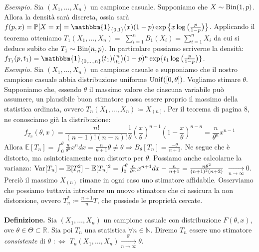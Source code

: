 \textit{Esempio.} Sia $(X_1,\ldots,X_n)$ un campione casuale. Supponiamo che $X\sim \operatorname{Bin}(1,p)$. Allora la densità sarà discreta, ossia sarà $f(p,x)=\mathbb{P}[X=x]=\mathbbm{1}_{\{0,1\}}(x)(1-p)\exp\big\{x \log\big(\frac{p}{1-p}\big)\big\}$. Applicando il teorema otteniamo $T_1(X_1,\ldots,X_n)=$ $\sum_{i=1}^n B_1(X_i)=\sum_{i=1}^n X_i$ da cui si deduce subito che $T_1\sim \operatorname{Bin}(n,p)$. In particolare possiamo scriverne la densità: $f_{T_1}(p,t_1)=\mathbbm{1}_{\{0,\ldots,n\}}(t_1)\binom{n}{t_1}(1-p)^n\exp\{t_1 \log\big(\frac{p}{1-p}\big)\}$. \\ 
\noindent\textit{Esempio.} Sia $(X_1,\ldots,X_n)$ un campione casuale e supponiamo che il nostro campione casuale abbia distribuzione uniforme $\operatorname{Unif}([0,\theta])$. Vogliamo stimare $\theta$. Supponiamo che, essendo $\theta$ il massimo valore che ciascuna variabile può assumere, un plausibile buon stimatore possa essere proprio il massimo della statistica ordinata, ovvero $T_n(X_1,\ldots,X_n)\coloneqq X_{(n)}$. Per il teorema di pagina 8, ne conosciamo già la distribuzione: 
$$f_{T_n}(\theta,x) = \frac{n!}{(n-1)!(n-n)!}\frac{1} {\theta} \left( \frac{x}{\theta} \right)^{n-1} \left (1 - \frac{x}{\theta}\right)^{n-n} = \frac{n}{\theta^n}x^{n-1}$$ 
Allora $\mathbb{E}[T_n]=\int_0^\theta \frac{n}{\theta^n}x^n dx=\frac{n}{n+1}\theta \neq \theta\Longrightarrow B_{\theta}[T_n]=\frac{-\theta}{n+1}$. 
Ne segue che è distorto, ma asintoticamente non distorto per $\theta$. 
Possiamo anche calcolarne la varianza: $\operatorname{Var}[T_n]=\mathbb{E}[T_n^2]-\mathbb{E}[T_n]^2=\int_0^\theta \frac{n}{\theta^n}x^{n+1} dx -\frac{n}{n+1}=\frac{n\theta^2}{(n+1)^2(n+2)}$
$\xrightarrow[n\rightarrow \infty]{}0$. 
Perciò il massimo $X_{(n)}$ rimane in ogni caso uno stimatore affidabile. Osserviamo che possiamo tuttavia introdurre un nuovo stimatore che ci assicura la non distorsione, ovvero $T_n^*\coloneqq \frac{n+1}{n}T$, che possiede le proprietà cercate. \\ \\

\textbf{Definizione.} Sia $(X_1,\ldots,X_n)$ un campione casuale con distribuzione $F(\theta,x)$, ove $\theta\in \Theta\subset \mathbb{R}$. Sia poi $T_n$ una statistica $\forall n\in \mathbb{N}$. Diremo $T_n$ essere uno stimatore \textit{consistente} di $\theta$ $:\Longleftrightarrow$ $T_n(X_1,\ldots,X_n)\xrightarrow[n\rightarrow \infty]{\mathbb{P}} \theta$. \\ \\

